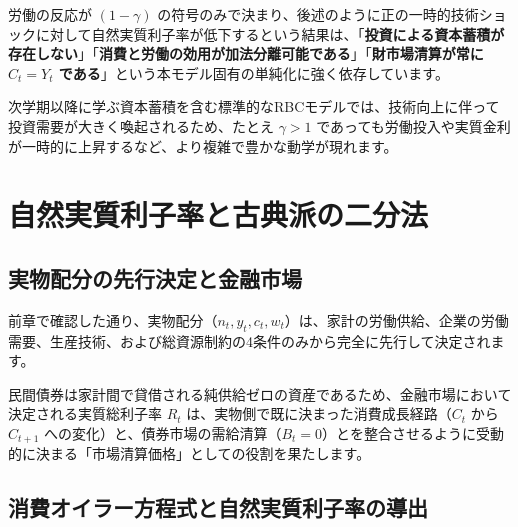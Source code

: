 \documentclass[
  japanese,
  lualatex,
  ja=standard,
  12pt,
  a4paper]{ltjsarticle}
\begin{document}
\begin{tcolorbox}[enhanced jigsaw, arc=.35mm, bottomrule=.15mm, bottomtitle=1mm, breakable, colback=white, colbacktitle=quarto-callout-important-color!10!white, colframe=quarto-callout-important-color-frame, coltitle=black, left=2mm, leftrule=.75mm, opacityback=0, opacitybacktitle=0.6, rightrule=.15mm, title=\textcolor{quarto-callout-important-color}{\faExclamation}\hspace{0.5em}{資本蓄積のないモデル特有の性質に関する注意}, titlerule=0mm, toprule=.15mm, toptitle=1mm]

労働の反応が \((1-\gamma)\)
の符号のみで決まり、後述のように正の一時的技術ショックに対して自然実質利子率が低下するという結果は、「\textbf{投資による資本蓄積が存在しない}」「\textbf{消費と労働の効用が加法分離可能である}」「\textbf{財市場清算が常に
\(C_t = Y_t\) である}」という本モデル固有の単純化に強く依存しています。

次学期以降に学ぶ資本蓄積を含む標準的なRBCモデルでは、技術向上に伴って投資需要が大きく喚起されるため、たとえ
\(\gamma > 1\)
であっても労働投入や実質金利が一時的に上昇するなど、より複雑で豊かな動学が現れます。

\end{tcolorbox}

\section{自然実質利子率と古典派の二分法}\label{ux81eaux7136ux5b9fux8ceaux5229ux5b50ux7387ux3068ux53e4ux5178ux6d3eux306eux4e8cux5206ux6cd5}

\subsection{実物配分の先行決定と金融市場}\label{ux5b9fux7269ux914dux5206ux306eux5148ux884cux6c7aux5b9aux3068ux91d1ux878dux5e02ux5834}

前章で確認した通り、実物配分（\(n_t, y_t, c_t, w_t\)）は、家計の労働供給、企業の労働需要、生産技術、および総資源制約の4条件のみから完全に先行して決定されます。

民間債券は家計間で貸借される純供給ゼロの資産であるため、金融市場において決定される実質総利子率
\(R_t\) は、実物側で既に決まった消費成長経路（\(C_t\) から \(C_{t+1}\)
への変化）と、債券市場の需給清算（\(B_t = 0\)）とを整合させるように受動的に決まる「市場清算価格」としての役割を果たします。

\subsection{消費オイラー方程式と自然実質利子率の導出}\label{ux6d88ux8cbbux30aaux30a4ux30e9ux30fcux65b9ux7a0bux5f0fux3068ux81eaux7136ux5b9fux8ceaux5229ux5b50ux7387ux306eux5c0eux51fa}
\end{document}
